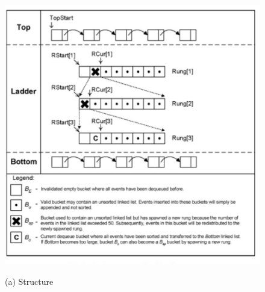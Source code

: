 \begin{figure}[H] \centering
\begin{minipage}{0.49\linewidth}
\includegraphics[width=\linewidth]{images/LadderQueue1.png}
\centerline{(a) Structure} \\


\end{minipage}
\end{figure}
